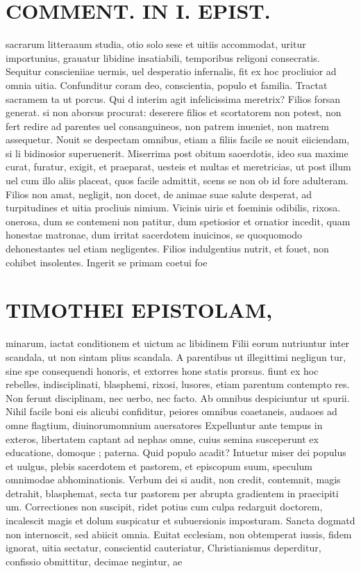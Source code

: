 \documentclass{article}
\begin{document}
\begin{pages}
\section*{COMMENT. IN I. EPIST. }
\marginpar{[ p.68 ]}\pstart sacrarum litteraaum studia, otio solo sese et uitiis accommodat, uritur importunius, grauatur libidine insatiabili, temporibus religoni consecratis. Sequitur conscieniiae uermis, uel desperatio infernalis, fit ex hoc procliuior ad omnia uitia. Confunditur coram deo, conscientia, populo et familia. Tractat sacramem ta ut porcus. Qui d interim agit infelicissima meretrix? Filios forsan generat. si non aborsus procurat: deserere filios et scortatorem non potest, non fert redire ad parentes uel consanguineos, non patrem inueniet, non matrem assequetur. Nouit se despectam omnibus, etiam a filiis facile se nouit eiiciendam, si li bidinosior superuenerit. Miserrima post obitum saoerdotis, ideo sua maxime curat, furatur, exigit, et praeparat, uesteis et multas et meretricias, ut post illum uel cum illo aliis placeat, quos facile admittit, scens se non ob id fore adulteram. Filios non amat, negligit, non docet, de animae suae salute desperat, ad turpitudines et uitia procliuis nimium. Vicinis uiris et foeminis odibilis, rixosa. onerosa, dum se contemeni non patitur, dum spetiosior et ornatior incedit, quam honestae matronae, dum irritat sacerdotem inuicinos, se quoquomodo dehonestantes uel etiam negligentes. Filios indulgentius nutrit, et fouet, non cohibet insolentes. Ingerit se primam coetui foe\pend
\section*{TIMOTHEI EPISTOLAM, }
\marginpar{[ p.69 ]}\pstart minarum, iactat conditionem et uictum ac libidinem Filii eorum nutriuntur inter scandala, ut non sintam plius scandala. A parentibus ut illegittimi negligun tur, sine spe consequendi honoris, et extorres hone statis prorsus. fiunt ex hoc rebelles, indisciplinati, blasphemi, rixosi, lusores, etiam parentum contempto res. Non ferunt disciplinam, nec uerbo, nec facto. Ab omnibus despiciuntur ut spurii. Nihil facile boni eis alicubi confiditur, peiores omnibus coaetaneis, audaoes ad omne flagtium, diuinorumomnium auersatores Expelluntur ante tempus in exteros, libertatem captant ad nephas omne, cuius semina susceperunt ex educatione, domoque ; paterna. Quid populo acadit? Intuetur miser dei populus et uulgus, plebis sacerdotem et pastorem, et episcopum suum, speculum omnimodae abhominationis. Verbum dei si audit, non credit, contemnit, magis detrahit, blasphemat, secta tur pastorem per abrupta gradientem in praecipiti um. Correctiones non suscipit, ridet potius cum culpa redarguit doctorem, incalescit magis et dolum suspicatur et subuersionis imposturam. Sancta dogmatd non internoscit, sed abiicit omnia. Euitat ecclesiam, non obtemperat iussis, fidem ignorat, uitia sectatur, conscientid cauteriatur, Christianismus deperditur, confissio obmittitur, decimae negintur, ae  \pend

\end{pages}
\end{document}
